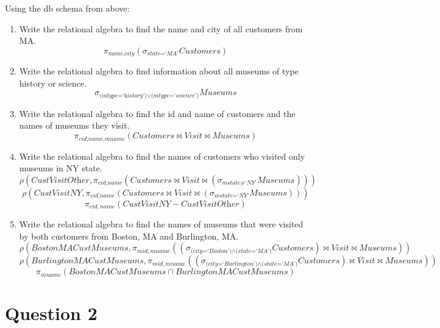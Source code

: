 \documentclass[letterpaper, 11pt]{article}
\begin{document}
Using the db schema from above:
\begin{enumerate}
    \item Write the relational algebra to find the name and city of all customers from MA.
    \[\pi_{\textit{name,city}}\left(\sigma_{\textit{state=`MA'}}\textit{Customers}\right)\]
    \item Write the relational algebra to find information about all museums of type history or science.
    \[\sigma_{\textit{(mtype=`history')} \vee \textit{(mtype=`science')}}\textit{Museums}\]
    \item Write the relational algebra to find the id and name of customers and the names of museums they visit.
    \[\pi_{\textit{cid,name,mname}}\left(\textit{Customers} \bowtie \textit{Visit} \bowtie \textit{Museums}\right)\]
    \item Write the relational algebra to find the names of customers who visited only museums in NY state.
    \[\rho\left(\textit{CustVisitOther}, \pi_{\textit{cid,name}}\left(\textit{Customers} \bowtie \textit{Visit} \bowtie \left(\sigma_{\textit{mstate}\neq\textit{`NY'}} \textit{Museums}\right)\right)\right)\]
    \[\rho\left(\textit{CustVisitNY}, \pi_{\textit{cid,name}}\left(\textit{Customers} \bowtie \textit{Visit} \bowtie \left(\sigma_{\textit{mstate=`NY'}} \textit{Museums}\right)\right)\right)\]
    \[\pi_{cid,name}\left(\textit{CustVisitNY} - \textit{CustVisitOther}\right)\]
    \item Write the relational algebra to find the names of museums that were visited by both customers from Boston, MA and Burlington, MA.
    \[\rho\left(\textit{BostonMACustMuseums}, \pi_{mid,mname}\left(\left(\sigma_{\textit{(city=`Boston')} \wedge \textit{(state=`MA')}} \textit{Customers}\right) \bowtie \textit{Visit} \bowtie \textit{Museums}\right)\right)\]
    \[\rho\left(\textit{BurlingtonMACustMuseums}, \pi_{mid,mname}\left(\left(\sigma_{\textit{(city=`Burlington')} \wedge \textit{(state=`MA')}} \textit{Customers}\right) \bowtie \textit{Visit} \bowtie \textit{Museums}\right)\right)\]
    \[\pi_{\textit{mname}}\left(\textit{BostonMACustMuseums} \cap \textit{BurlingtonMACustMuseums}\right)\]
\end{enumerate}

\section*{Question 2}
\end{document}

